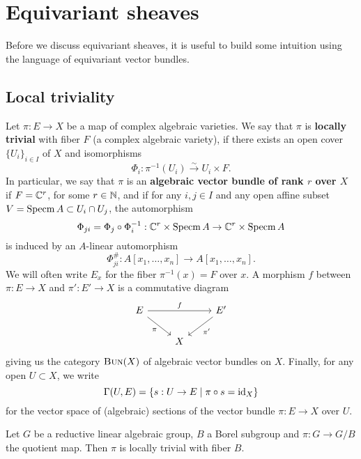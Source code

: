 \section{Equivariant sheaves}

Before we discuss equivariant sheaves, it is useful to build some intuition using
the language of equivariant vector bundles.

\subsection{Local triviality}

\begin{definition}
    Let $\pi:E\to X$ be a map of complex algebraic varieties. We say that $\pi$ is \textbf{locally trivial}
    with fiber $F$ (a complex algebraic variety), if there exists an open cover $\{U_i\}_{i\in I}$ of $X$ and isomorphisms
    \[\Phi_i:\pi^{-1}(U_i)\xrightarrow{\sim} U_i\times F.\]
    In particular, we say that $\pi$ is an \textbf{algebraic vector bundle of rank $r$ over $X$}
    if $F=\mathbb{C}^r$, for some $r\in\mathbb{N}$,
    and if for any $i,j\in I$ and any open affine subset $V=\operatorname{Specm} A\subset U_i\cap U_j$, the automorphism
    \[\Phi_{ji}=\Phi_j\circ\Phi_i^{-1}:\mathbb{C}^r\times \operatorname{Specm} A\to\mathbb{C}^r\times \operatorname{Specm} A\]
    is induced by an $A$-linear automorphism 
    \[\Phi_{ji}^\#: A[x_1,\ldots,x_n]\to A[x_1,\ldots,x_n].\]
    We will often write $E_x$ for the fiber $\pi^{-1}(x)=F$ over $x$. A morphism $f$ between $\pi:E\to X$
    and $\pi':E'\to X$ is a commutative diagram
    \begin{equation*}
        \begin{tikzcd}
            E\ar{rr}{f}\ar[swap]{rd}{\pi} & & E'\ar{ld}{\pi'}\\
            & X &
        \end{tikzcd}
    \end{equation*}
    giving us the category $\textsc{Bun}(X)$ of algebraic vector bundles on $X$.
    Finally, for any open $U\subset X$, we write
    \[\Gamma(U,E)= \{s:U\to E\mid \pi\circ s=\operatorname{id}_X\}\]
    for the vector space of (algebraic) sections of the vector bundle $\pi:E\to X$ over $U$.
\end{definition}

\begin{proposition}
\label{principalBbundle}
Let $G$ be a reductive linear algebraic group, $B$ a Borel subgroup and $\pi : G \to G/B$ the quotient map. Then
$\pi$ is locally trivial with fiber $B$.
\end{proposition}

